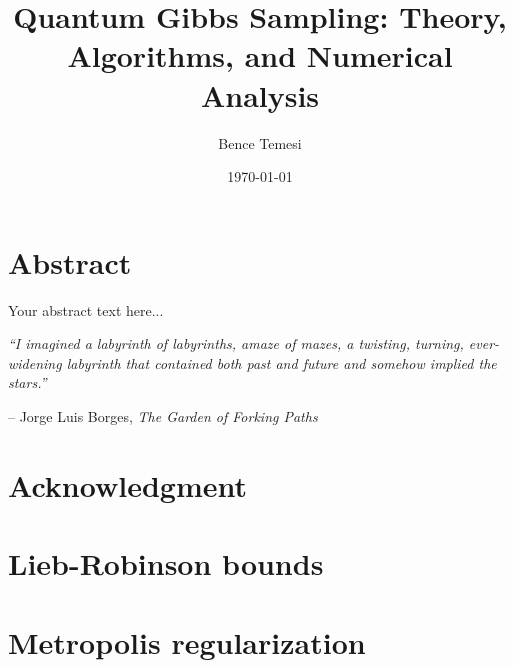 \documentclass[11pt, a4paper, openany]{book}
\title{Quantum Gibbs Sampling: Theory, Algorithms, and Numerical Analysis}
\author{Bence Temesi}
\date{\today}
\theoremstyle{definition}
\begin{document}
\maketitle
\clearpage
\thispagestyle{empty}

\clearpage
\chapter*{Abstract}
Your abstract text here...

\clearpage
\vspace*{\fill}
\vspace{3cm} %

\hfill
\begin{minipage}{0.65\textwidth}
\raggedleft
\textit{%
``I imagined a labyrinth of labyrinths, amaze of mazes, a twisting, turning, ever-widening labyrinth that contained both past and future and somehow implied the stars.''}

\vspace{0.8em}
\normalfont
-- Jorge Luis Borges, \textit{The Garden of Forking Paths}
\end{minipage}

\vspace*{\fill}

\clearpage
\chapter*{Acknowledgment}

\tableofcontents



% 


\printbibliography[title={References}, heading=bibintoc]

\begin{appendices}
    \chapter{Lieb-Robinson bounds}
    \chapter{Metropolis regularization}

\end{appendices}
\end{document}
